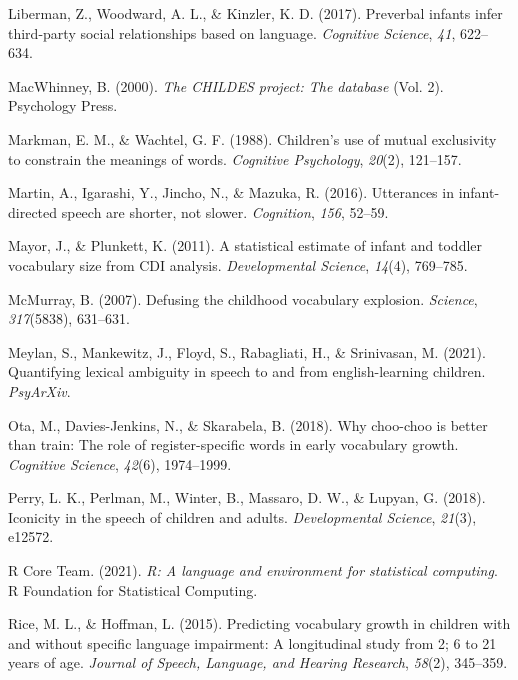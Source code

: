 \documentclass[10pt, letterpaper]{article}
\newenvironment{CSLReferences}%
  {}%
  {\par}
\begin{document}
\begin{CSLReferences}{1}{0}
\leavevmode\hypertarget{ref-liberman2017preverbal}{}%
Liberman, Z., Woodward, A. L., \& Kinzler, K. D. (2017). Preverbal
infants infer third-party social relationships based on language.
\emph{Cognitive Science}, \emph{41}, 622--634.

\leavevmode\hypertarget{ref-macwhinney2000childes}{}%
MacWhinney, B. (2000). \emph{The CHILDES project: The database} (Vol.
2). Psychology Press.

\leavevmode\hypertarget{ref-markman1988children}{}%
Markman, E. M., \& Wachtel, G. F. (1988). Children's use of mutual
exclusivity to constrain the meanings of words. \emph{Cognitive
Psychology}, \emph{20}(2), 121--157.

\leavevmode\hypertarget{ref-martin2016utterances}{}%
Martin, A., Igarashi, Y., Jincho, N., \& Mazuka, R. (2016). Utterances
in infant-directed speech are shorter, not slower. \emph{Cognition},
\emph{156}, 52--59.

\leavevmode\hypertarget{ref-mayor2011statistical}{}%
Mayor, J., \& Plunkett, K. (2011). A statistical estimate of infant and
toddler vocabulary size from CDI analysis. \emph{Developmental Science},
\emph{14}(4), 769--785.

\leavevmode\hypertarget{ref-mcmurray2007defusing}{}%
McMurray, B. (2007). Defusing the childhood vocabulary explosion.
\emph{Science}, \emph{317}(5838), 631--631.

\leavevmode\hypertarget{ref-meylan2021quantifying}{}%
Meylan, S., Mankewitz, J., Floyd, S., Rabagliati, H., \& Srinivasan, M.
(2021). Quantifying lexical ambiguity in speech to and from
english-learning children. \emph{PsyArXiv}.

\leavevmode\hypertarget{ref-ota2018choo}{}%
Ota, M., Davies-Jenkins, N., \& Skarabela, B. (2018). Why choo-choo is
better than train: The role of register-specific words in early
vocabulary growth. \emph{Cognitive Science}, \emph{42}(6), 1974--1999.

\leavevmode\hypertarget{ref-perry2018iconicity}{}%
Perry, L. K., Perlman, M., Winter, B., Massaro, D. W., \& Lupyan, G.
(2018). Iconicity in the speech of children and adults.
\emph{Developmental Science}, \emph{21}(3), e12572.

\leavevmode\hypertarget{ref-r2021}{}%
R Core Team. (2021). \emph{R: A language and environment for statistical
computing}. R Foundation for Statistical Computing.

\leavevmode\hypertarget{ref-rice2015predicting}{}%
Rice, M. L., \& Hoffman, L. (2015). Predicting vocabulary growth in
children with and without specific language impairment: A longitudinal
study from 2; 6 to 21 years of age. \emph{Journal of Speech, Language,
and Hearing Research}, \emph{58}(2), 345--359.


\end{CSLReferences}
\end{document}
